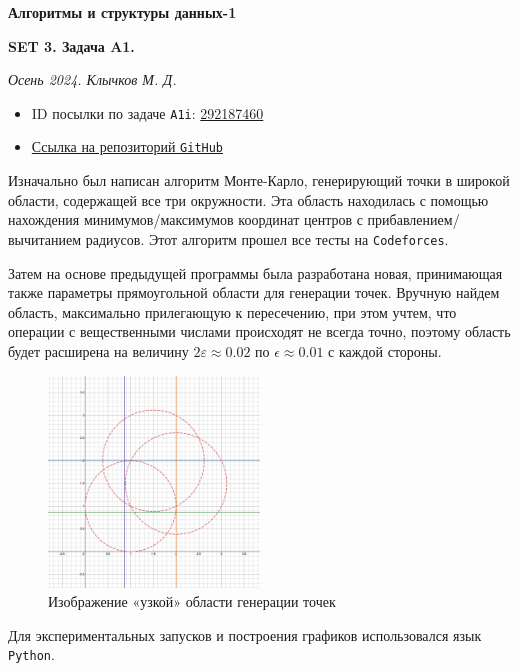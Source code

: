 \documentclass[11pt,a4paper]{scrarticle}
\author{Клычков Максим Дмитриевич}
\theoremstyle{definition}
\begin{document}
\centerline{\textbf{\huge Алгоритмы и структуры данных-1}}
\centerline{\textbf{SET 3. Задача A1.}}
\begin{flushright}
	\emph{Осень 2024. Клычков М. Д.}
\end{flushright}

\begin{itemize}
	\item ID посылки по задаче \texttt{A1i}: \href{https://dsahse.contest.codeforces.com/group/NOflOR1Qt0/contest/565612/submission/292187460}{292187460}
	\item \href{https://github.com/maklybae/algorithms/tree/main/set03/a1}{Ссылка на репозиторий \texttt{GitHub}}
\end{itemize}

Изначально был написан алгоритм Монте-Карло, генерирующий точки в широкой области, содержащей все три окружности. Эта область находилась с помощью нахождения минимумов/максимумов координат центров с прибавлением/вычитанием радиусов. Этот алгоритм прошел все тесты на \texttt{Codeforces}.

Затем на основе предыдущей программы была разработана новая, принимающая также параметры прямоугольной области для генерации точек. Вручную найдем область, максимально прилегающую к пересечению, при этом учтем, что операции с вещественными числами происходят не всегда точно, поэтому область будет расширена на величину $2\varepsilon \approx 0.02$ по $\epsilon \approx 0.01$ с каждой стороны.

\begin{figure}[htp]
	\centering
	\includegraphics[width=0.5\textwidth]{../static/desmos-graph.png}
	\caption{Изображение «узкой» области генерации точек}
	\label{fig:desmos}
\end{figure}

Для экспериментальных запусков и построения графиков использовался язык \texttt{Python}.
\end{document}
